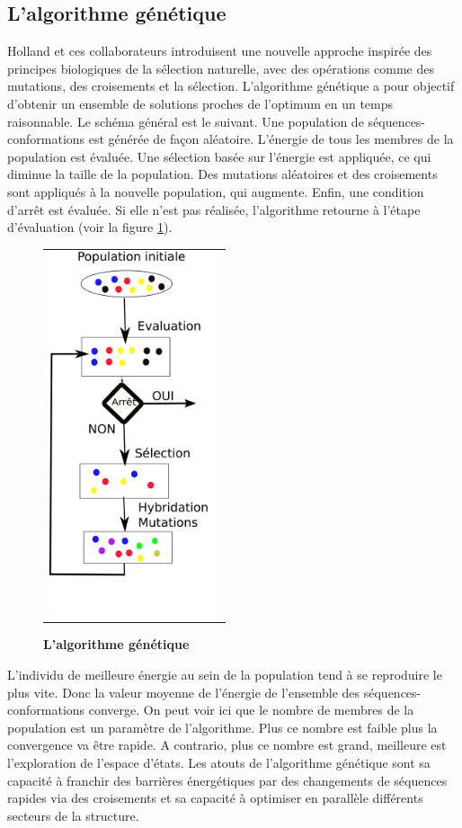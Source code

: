 \subsection{L'algorithme génétique}

Holland et ces collaborateurs \cite{Goldberg88} introduisent une nouvelle approche inspirée des principes biologiques de la sélection naturelle, avec des opérations comme des mutations, des croisements et la sélection. L'algorithme génétique a pour objectif d'obtenir un ensemble de solutions proches de l'optimum en un temps raisonnable.
Le schéma général est le suivant. Une population de séquences-conformations est générée de façon aléatoire. L'énergie de tous les membres de la population est évaluée. Une sélection basée sur l'énergie est appliquée, ce qui diminue la taille de la population. Des mutations aléatoires et des croisements sont appliqués à la nouvelle population, qui augmente. Enfin, une condition d'arrêt est évaluée. Si elle n'est pas réalisée, l'algorithme retourne à l'étape d'évaluation (voir la figure \ref{fig:algo_gene}). 

\begin{figure}[!h]
  \centering
  \begin{tabular}{c}
    \includegraphics[width=5cm]{figure/algo_genetique.pdf} \\
  \end{tabular}
  \caption{\textbf{L'algorithme génétique}}
  \label{fig:algo_gene}
\end{figure}


L'individu de meilleure énergie au sein de la population tend à se reproduire le plus vite. Donc la valeur moyenne de l'énergie de l'ensemble des séquences-conformations converge. On peut voir ici que le nombre de membres de la population est un paramètre de l'algorithme. Plus ce nombre est faible plus la convergence va être rapide. A contrario, plus ce nombre est grand, meilleure est l'exploration de l'espace d'états. Les atouts de l'algorithme génétique sont sa capacité à franchir des barrières énergétiques par des changements de séquences rapides via des croisements et sa capacité à optimiser en parallèle différents secteurs de la structure.

